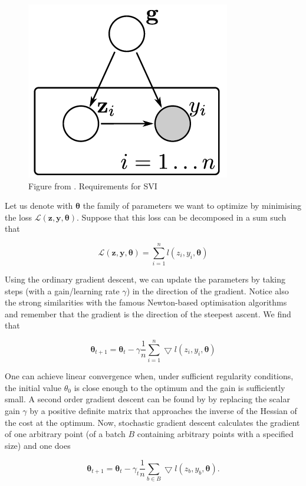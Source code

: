 \documentclass[12pt,a4paper,oneside]{book}
\begin{document}
{\begin{figure}[!htb]
     \centering
     \includegraphics[width=0.4\linewidth]{plot_variational_inference}
     \caption{Figure from \cite{hensman2013gaussian}. Requirements for SVI}\label{fig:var_app_1.1}
\end{figure}

Let us denote with $\bm{\theta}$ the family of parameters we want to optimize by minimising the loss $\mathcal{L}(\bm{z},\bm{y},\bm{\theta})$. Suppose that this loss can be decomposed in a sum such that 

\begin{equation}
\mathcal{L}(\bm{z},\bm{y},\bm{\theta}) = \sum\limits_{i=1}^n l (z_i,y_i,\bm{\theta})
\end{equation}

Using the ordinary gradient descent, we can update the parameters by taking steps (with a gain/learning rate $\gamma$) in the direction of the gradient. Notice also the strong similarities with the famous Newton-based optimisation algorithms and remember that the gradient is the direction of the steepest ascent. We find that 

\begin{equation}\label{gradient_descent}
\bm{\theta}_{t+1} = \bm{\theta}_{t} -  \gamma \dfrac{1}{n} \sum\limits_{i=1}^n \bigtriangledown l(z_i,y_i,\bm{\theta})
\end{equation}

One can achieve linear convergence when, under sufficient regularity conditions, the initial value $\theta_0$ is close enough to the optimum and the gain is sufficiently small. A second order gradient descent can be found by by replacing the scalar gain $\gamma$ by a positive definite matrix that approaches the inverse of the Hessian of the cost at the optimum. Now, stochastic gradient descent calculates the gradient of one arbitrary point (of a batch $B$ containing arbitrary points with a specified size) and one does


\begin{equation}\label{stoch_gradient_descent}
\bm{\theta}_{t+1} = \bm{\theta}_{t} -  \gamma_t \dfrac{1}{n} \sum\limits_{b \in B } \bigtriangledown l(z_b,y_b,\bm{\theta}).
\end{equation}

}
\end{document}
